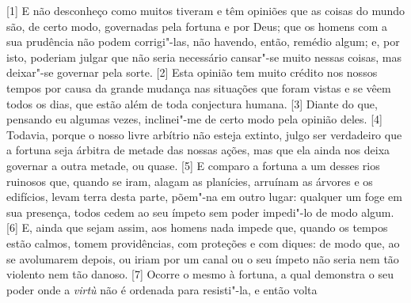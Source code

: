 {[}1{]} E não desconheço como muitos tiveram e têm opiniões que as coisas do mundo são, de
certo modo, governadas pela fortuna e por Deus; que os homens com a sua
prudência não podem corrigi"-las, não havendo, então, remédio algum; e,
por isto, poderiam julgar que não seria necessário cansar"-se muito
nessas coisas, mas deixar"-se governar pela sorte. {[}2{]} Esta opinião tem muito crédito nos nossos tempos por
causa da grande mudança nas situações que foram vistas e se vêem todos
os dias, que estão além de toda conjectura humana. {[}3{]} Diante do
que, pensando eu algumas vezes, inclinei"-me de certo modo pela opinião
deles. {[}4{]} Todavia, porque o
nosso livre arbítrio não esteja extinto, julgo ser verdadeiro que a
fortuna seja árbitra de metade das nossas ações, mas que ela ainda nos
deixa governar a outra metade, ou quase. {[}5{]} E comparo a fortuna a
um desses rios ruinosos que, quando se iram, alagam as planícies,
arruínam as árvores e os edifícios, levam terra desta parte, põem"-na em
outro lugar: qualquer um foge em sua presença, todos cedem ao seu ímpeto
sem poder impedi"-lo de modo algum. {[}6{]} E, ainda que sejam assim, aos
homens nada impede que, quando os tempos estão calmos, tomem
providências, com proteções e com diques: de modo que, ao se avolumarem
depois, ou iriam por um canal ou o seu ímpeto não seria nem tão violento
nem tão danoso. {[}7{]} Ocorre o mesmo à fortuna, a qual demonstra o seu
poder onde a \emph{virtù} não é ordenada para resisti"-la, e então volta
